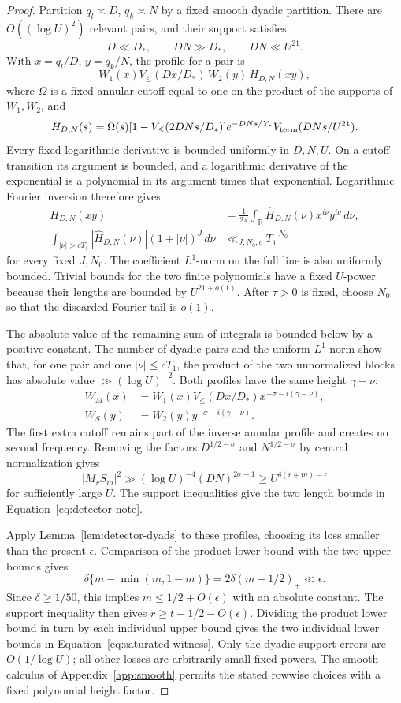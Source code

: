 \documentclass[12pt]{article}
\begin{document}
\begin{proof}
Partition \(q_l\asymp D\), \(q_k\asymp N\) by a fixed smooth
dyadic partition.  There are \(O((\log U)^2)\) relevant pairs,
and their support satisfies
\[
 D\ll D_*,\qquad DN\gg D_*,\qquad DN\ll U^{21}.
\]
With \(x=q_l/D\), \(y=q_k/N\), the profile for a pair is
\[
 W_1(x)V_{\le}(Dx/D_*)\,W_2(y)\,H_{D,N}(xy),
\]
where \(\Omega\) is a fixed annular cutoff equal to one on the
product of the supports of \(W_1,W_2\), and
\[
 H_{D,N}(s)=\Omega(s)
   [1-V_{\le}(2DNs/D_*)]e^{-DNs/Y_*}
   V_{\rm term}(DNs/U^{21}).
\]
Every fixed logarithmic derivative is bounded uniformly in
\(D,N,U\).  On a cutoff transition its argument is bounded, and a
logarithmic derivative of the exponential is a polynomial in its
argument times that exponential.  Logarithmic Fourier inversion
therefore gives
\[
 \begin{split}
 H_{D,N}(xy)&=\frac1{2\pi}\int_{\mathbb R}
      \widehat H_{D,N}(\nu)x^{i\nu}y^{i\nu}\,d\nu,\\
 \int_{|\nu|>cT_1}|\widehat H_{D,N}(\nu)|
       (1+|\nu|)^J\,d\nu&\ll_{J,N_0,c}T_1^{-N_0}
 \end{split}
\]
for every fixed \(J,N_0\).  The coefficient \(L^1\)-norm on the
full line is also uniformly bounded.  Trivial bounds for the two
finite polynomials have a fixed \(U\)-power because their lengths
are bounded by \(U^{21+o(1)}\).  After \(\tau>0\) is fixed, choose
\(N_0\) so that the discarded Fourier tail is \(o(1)\).

The absolute value of the remaining sum of integrals is bounded
below by a positive constant.  The number of dyadic pairs and the
uniform \(L^1\)-norm show that, for one pair and one
\(|\nu|\le cT_1\), the product of the two unnormalized blocks has
absolute value \(\gg(\log U)^{-2}\).  Both profiles have the
same height \(\gamma-\nu\):
\[
 \begin{split}
 W_M(x)&=W_1(x)V_{\le}(Dx/D_*)x^{-\sigma-i(\gamma-\nu)},\\
 W_S(y)&=W_2(y)y^{-\sigma-i(\gamma-\nu)}.
 \end{split}
\]
The first extra cutoff remains part of the inverse annular profile
and creates no second frequency.  Removing the factors
\(D^{1/2-\sigma}\) and \(N^{1/2-\sigma}\) by central normalization
gives
\[
 |M_rS_m|^2\gg(\log U)^{-4}(DN)^{2\sigma-1}
 \ge U^{\delta(r+m)-\epsilon}
\]
for sufficiently large \(U\).  The support inequalities give the
two length bounds in Equation~\eqref{eq:detector-note}.

Apply Lemma~\ref{lem:detector-dyads} to these profiles, choosing its
loss smaller than the present \(\epsilon\).  Comparison of the
product lower bound with the two upper bounds gives
\[
 \delta\{m-\min(m,1-m)\}
   =2\delta(m-1/2)_+\ll\epsilon.
\]
Since \(\delta\ge1/50\), this implies
\(m\le1/2+O(\epsilon)\) with an absolute constant.
The support inequality then gives
\(r\ge t-1/2-O(\epsilon)\).
Dividing the product lower bound in turn by each individual upper
bound gives the two individual lower bounds in
Equation~\eqref{eq:saturated-witness}.  Only the dyadic support
errors are \(O(1/\log U)\); all other losses are arbitrarily small
fixed powers.  The smooth calculus of Appendix~\ref{app:smooth} permits the stated
rowwise choices with a fixed polynomial height factor.
\end{proof}
\end{document}
